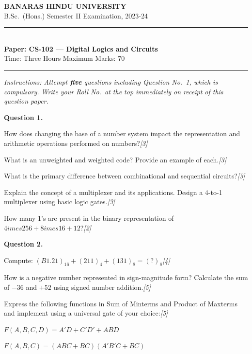 \documentclass[11pt,a4paper]{article}
\newcommand{\pts}[1]{\hfill   \textit{[#1]}}
\begin{document}
\begin{center}
  {\large\bfseries BANARAS HINDU UNIVERSITY}\\[2pt]
  {
\normalsize B.Sc.\ (Hons.) Semester II Examination, 2023-24}\\[6pt]
  \rule{0.8\linewidth}{0.5pt}\\[6pt]
  {\large\bfseries Paper: CS-102 --- Digital Logics and Circuits}\\[4pt]
  {
\normalsize Time: Three Hours \hfill Maximum Marks: 70}
\end{center}
\rule{\linewidth}{0.4pt}
\smallskip



\noindent   \textit{Instructions: Attempt   \textbf{five} questions including Question No.~1, which is compulsory. Write your Roll No.\ at the top immediately on receipt of this question paper.}
\bigskip




\noindent   \textbf{Question 1.}

\begin{parts}
  \item How does changing the base of a number system impact the representation and arithmetic operations performed on numbers?\pts{3}
  \item What is an unweighted and weighted code? Provide an example of each.\pts{3}
  \item What is the primary difference between combinational and sequential circuits?\pts{3}
  \item Explain the concept of a multiplexer and its applications. Design a 4-to-1 multiplexer using basic logic gates.\pts{3}
  \item How many 1's are present in the binary representation of $4 imes256 + 8 imes16 + 12$?\pts{2}
\end{parts}

\bigskip



\noindent   \textbf{Question 2.}

\begin{parts}
  \item Compute: $(B1.21)_{16} + (211)_{4} + (131)_{8} = (?)_{8}$\pts{4}
  \item How is a negative number represented in sign-magnitude form? Calculate the sum of $-36$ and $+52$ using signed number addition.\pts{5}
  \item Express the following functions in Sum of Minterms and Product of Maxterms and implement using a universal gate of your choice:\pts{5}
    
\begin{parts}
      \item $F(A,B,C,D) = A'D + C'D' + ABD$
      \item $F(A,B,C) = (ABC + BC)(A'B'C + BC)$
    \end{parts}
\end{parts}
\end{document}
